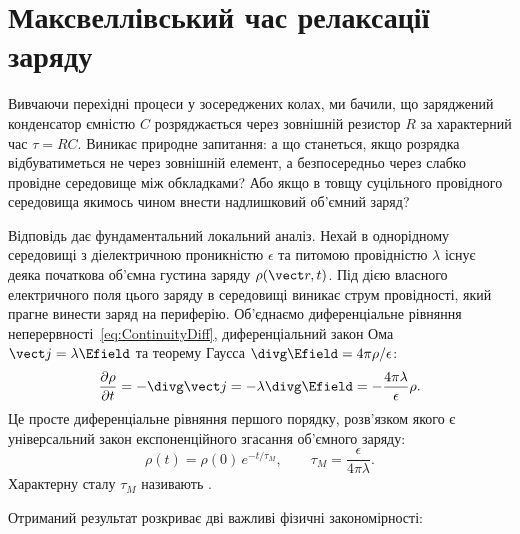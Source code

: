 \section{Максвеллівський час релаксації заряду}

Вивчаючи перехідні процеси у зосереджених колах, ми бачили, що заряджений конденсатор ємністю $C$ розряджається через зовнішній резистор $R$ за характерний час $\tau = RC$. Виникає природне запитання: а що станеться, якщо розрядка відбуватиметься не через зовнішній елемент, а безпосередньо через слабко провідне середовище між обкладками? Або якщо в товщу суцільного провідного середовища якимось чином внести надлишковий об'ємний заряд?

Відповідь дає фундаментальний локальний аналіз. Нехай в однорідному середовищі з діелектричною проникністю $\epsilon$ та питомою провідністю $\lambda$ існує деяка початкова об'ємна густина заряду $\rho(\vect r, t)$. Під дією власного електричного поля цього заряду в середовищі виникає струм провідності, який прагне винести заряд на периферію. Об'єднаємо диференціальне рівняння неперервності~\eqref{eq:ContinuityDiff}, диференціальний закон Ома $\vect j = \lambda\Efield$ та теорему Гаусса $\divg\Efield = 4\pi\rho/\epsilon$:
\begin{equation*}
    \frac{\partial\rho}{\partial t} = -\divg\vect j = -\lambda\divg\Efield = -\frac{4\pi\lambda}{\epsilon}\rho.
\end{equation*}
Це просте диференціальне рівняння першого порядку, розв'язком якого є універсальний закон експоненційного згасання об'ємного заряду:
\begin{equation}\label{eq:MaxwellRelaxation}
    \rho(t) = \rho(0)\,e^{-t/\tau_M}, \qquad \tau_M = \frac{\epsilon}{4\pi\lambda}.
\end{equation}
Характерну сталу $\tau_M$ називають .

Отриманий результат розкриває дві важливі фізичні закономірності:

